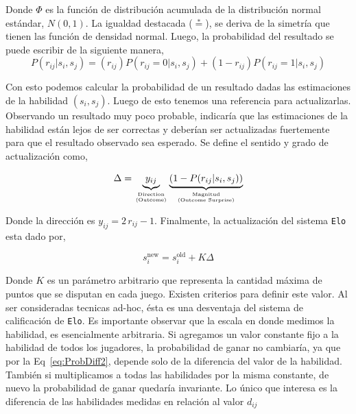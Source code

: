 \documentclass[11pt,twoside, spanish]{report} %
\newcommand\hfrac[2]{\genfrac{}{}{0pt}{}{#1}{#2}}
\begin{document}
Donde $\Phi$ es la funci\'on de distribuci\'on acumulada de la distribuci\'on normal est\'andar, $N(0, 1)$.
La igualdad destacada ($\overset{*}{=}$), se deriva de la simetr\'ia que tienen las funci\'on de densidad normal.
Luego, la probabilidad del resultado se puede escribir de la siguiente manera,
\begin{equation}
P(r_{ij}|s_i,s_j) = (r_{ij}) P(r_{ij}=0|s_i,s_j) +  (1-r_{ij})P(r_{ij}=1|s_i,s_j)
\end{equation}

Con esto podemos calcular la probabilidad de un resultado dadas las estimaciones de la habilidad $ (s_i, s_j) $.
Luego de esto tenemos una referencia para actualizarlas.
Observando un resultado muy poco probable, indicar\'ia que las estimaciones de la habilidad est\'an lejos de ser correctas y deber\'ian ser actualizadas fuertemente para que el resultado observado sea esperado.
Se define el sentido y grado de actualizaci\'on como,

\begin{equation}
\Delta = \underbrace{y_{ij}}_{\hfrac{\text{Direction}}{\text{(Outcome)}}}\underbrace{\left(1-P(r_{ij}|s_i,s_j)\right)}_{\hfrac{\text{Magnitud}}{\text{(Outcome Surprise)}}}
\end{equation}

Donde la direcci\'on es $y_{ij} =  2\,r_{ij} - 1$.
Finalmente, la actualizaci\'on del sistema \texttt{Elo} esta dado por,

\begin{equation}\label{eq:elo}
s_i^{\text{new}} = s_i^{\text{old}} + K \Delta
\end{equation}

Donde $K$ es un par\'ametro arbitrario que representa la cantidad m\'axima de puntos que se disputan en cada juego.
Existen criterios para definir este valor.
Al ser consideradas tecnicas ad-hoc, \'esta es una desventaja del sistema de calificaci\'on de \texttt{Elo}.
Es importante observar que la escala en donde medimos la habilidad, es esencialmente arbitraria.
Si agregamos un valor constante fijo a la habilidad de todos los jugadores, la probabilidad de ganar no cambiar\'ia, ya que por la Eq~\ref{eq:ProbDiff2}, depende solo de la diferencia del valor de la habilidad.
Tambi\'en si multiplicamos a todas las habilidades por la misma constante, de nuevo la probabilidad de ganar quedar\'ia invariante.
Lo \'unico que interesa es la diferencia de las habilidades medidas en relaci\'on al valor $d_{ij}$
\end{document}
